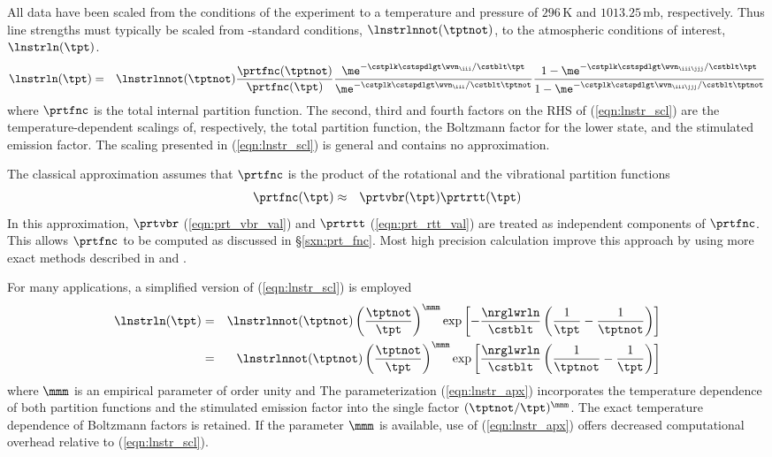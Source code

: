 \documentclass[12pt]{article}
\begin{document}
All  data have been scaled from the conditions of the experiment
to a temperature and pressure of $296$\,K and $1013.25$\,mb, respectively.
Thus line strengths must typically be scaled from -standard
conditions, $\lnstrlnnot(\tptnot)$, to the atmospheric conditions of
interest, $\lnstrln(\tpt)$.
\begin{eqnarray}
\lnstrln(\tpt) & = & \lnstrlnnot(\tptnot)
\frac{\prtfnc(\tptnot)}{\prtfnc(\tpt)}
\frac{\me^{-\cstplk \cstspdlgt \wvn_{\iii} / \cstblt \tpt }}
{\me^{-\cstplk \cstspdlgt \wvn_{\iii} / \cstblt \tptnot}}
\frac{1 - \me^{-\cstplk \cstspdlgt \wvn_{\iii \jjj} / \cstblt \tpt }}
{1 - \me^{-\cstplk \cstspdlgt \wvn_{\iii \jjj} / \cstblt \tptnot }}
\label{eqn:lnstr_scl}
\end{eqnarray}
where $\prtfnc$ is the total internal partition function.
The second, third and fourth factors on the RHS of
(\ref{eqn:lnstr_scl}) are the temperature-dependent scalings of,
respectively, the total partition function, the Boltzmann factor for
the lower state, and the stimulated emission factor.
The scaling presented in (\ref{eqn:lnstr_scl}) is general and contains 
no approximation. 

The classical approximation \cite[]{RoY89,ThS99} assumes that
$\prtfnc$ is the product of the rotational and the vibrational
partition functions 
\begin{eqnarray}
\prtfnc(\tpt) & \approx & \prtvbr(\tpt) \prtrtt(\tpt)
\label{eqn:prt_fnc_sov_dfn}
\end{eqnarray}
In this approximation, $\prtvbr$ (\ref{eqn:prt_vbr_val}) and $\prtrtt$ 
(\ref{eqn:prt_rtt_val}) are treated as independent components of
$\prtfnc$.
This allows $\prtfnc$ to be computed as discussed in
\S\ref{sxn:prt_fnc}. 
Most high precision calculation improve this approach by using more
exact methods described in \cite{GHR90} and \cite{GKH00}.

For many applications, a simplified version of (\ref{eqn:lnstr_scl})
is employed
\begin{eqnarray}
\lnstrln(\tpt) & = & \lnstrlnnot(\tptnot)
\left( \frac{\tptnot}{\tpt} \right)^{\mmm}
\exp\left[ -\frac{\nrglwrln}{\cstblt} 
\left( \frac{1}{\tpt} - \frac{1}{\tptnot} \right) \right] \nonumber \\
& = & \lnstrlnnot(\tptnot)
\left( \frac{\tptnot}{\tpt} \right)^{\mmm}
\exp\left[ \frac{\nrglwrln}{\cstblt} 
\left( \frac{1}{\tptnot} - \frac{1}{\tpt} \right) \right]
\label{eqn:lnstr_apx}
\end{eqnarray}
where $\mmm$ is an empirical parameter of order unity and 
The parameterization (\ref{eqn:lnstr_apx}) incorporates the
temperature dependence of both partition functions and the stimulated 
emission factor into the single factor $(\tptnot/\tpt)^{\mmm}$.
The exact temperature dependence of Boltzmann factors is retained.
If the parameter $\mmm$ is available, use of (\ref{eqn:lnstr_apx}) 
offers decreased computational overhead relative to
(\ref{eqn:lnstr_scl}). 
\end{document}

